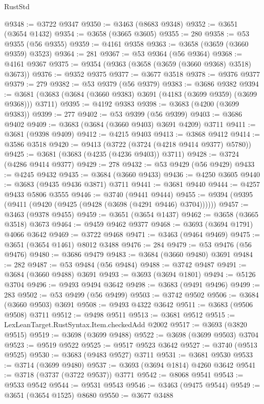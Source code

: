 \begin{lexlean}{RustStd}
\begin{coremodule}
@9348 := @3722 @9347
@9350 := @3463 (@8683 @9348)
@9352 := @3651 (@3654 @1432)
@9354 := @3658 (@3665 @3605)
@9355 := 280
@9358 := @53 @9355 (@56 @9355)
@9359 := @4161 @9358
@9363 := @3658 (@3659 (@3660 @9359) @3523)
@9364 := 281
@9367 := @53 @9364 (@56 @9364)
@9368 := @4161 @9367
@9375 := @9354 (@9363 (@3658 (@3659 (@3660 @9368) @3518) @3673))
@9376 := @9352 @9375
@9377 := @3677 @3518
@9378 := @9376 @9377
@9379 := 279
@9382 := @53 @9379 (@56 @9379)
@9383 := @3686 @9382
@9394 := @3681 (@3683 (@3684 (@3660 @9383) @3691 (@4183 (@3699 @9359) (@3699 @9368))) @3711)
@9395 := @4192 @9383
@9398 := @3683 (@4200 (@3699 @9383))
@9399 := 277
@9402 := @53 @9399 (@56 @9399)
@9403 := @3686 @9402
@9409 := @3683 (@3684 (@3660 @9403) @3691 @4209) @3711
@9411 := @3681 (@9398 @9409)
@9412 := @4215 @9403
@9413 := @3868 @9412
@9414 := @3586 @3518
@9420 := @9413 (@3722 (@3724 (@4218 @9414 @9377) @5780))
@9425 := @3681 (@3683 (@4235 (@4236 @9403)) @3711)
@9428 := @3724 (@4286 @9414 @9377)
@9429 := 278
@9432 := @53 @9429 (@56 @9429)
@9433 := @4245 @9432
@9435 := @3684 (@3660 @9433)
@9436 := @4250 @3605
@9440 := @3683 (@9435 @9436 @3871) @3711
@9441 := @3681 @9440
@9444 := @4257 @9433 @5806 @3555
@9446 := @3740 (@9441 @9444)
@9455 := @9394 (@9395 (@9411 (@9420 (@9425 (@9428 (@3698 (@4291 @9446) @3704))))))
@9457 := @3463 (@9378 @9455)
@9459 := @3651 (@3654 @1437)
@9462 := @3658 (@3665 @3518) @3673
@9464 := @9459 @9462 @9377
@9468 := @3693 (@3694 @1791) @4066 @3642
@9469 := @3722 @9468
@9471 := @3463 (@9464 @9469)
@9475 := @3651 (@3654 @1461) @8012 @3488
@9476 := 284
@9479 := @53 @9476 (@56 @9476)
@9480 := @3686 @9479
@9483 := @3684 (@3660 @9480) @3691
@9484 := 282
@9487 := @53 @9484 (@56 @9484)
@9488 := @3742 @9487
@9491 := @3684 (@3660 @9488) @3691
@9493 := @3693 (@3694 @1801)
@9494 := @5126 @3704
@9496 := @9493 @9494 @3642
@9498 := @3683 (@9491 @9496)
@9499 := 283
@9502 := @53 @9499 (@56 @9499)
@9503 := @3742 @9502
@9506 := @3684 (@3660 @9503) @3691
@9508 := @9493 @4322 @3642
@9511 := @3683 (@9506 @9508) @3711
@9512 := @9498 @9511
@9513 := @3681 @9512
@9515 := LexLeanTarget.RustSyntax.Item.checkedAdd @2002
@9517 := @3693 (@3820 @9515)
@9519 := @3698 (@3699 @9488)
@9522 := @3698 (@3699 @9503) @3704
@9523 := @9519 @9522
@9525 := @9517 @9523 @3642
@9527 := @3740 (@9513 @9525)
@9530 := @3683 (@9483 @9527) @3711
@9531 := @3681 @9530
@9533 := @3714 (@3699 @9480)
@9537 := @3693 (@3694 @1814) @4260 @3642
@9541 := @3718 (@3737 (@3722 @9537)) @3771
@9542 := @8068 @9541
@9543 := @9533 @9542
@9544 := @9531 @9543
@9546 := @3463 (@9475 @9544)
@9549 := @3651 (@3654 @1525) @8680
@9550 := @3677 @3488

\end{coremodule}
\end{lexlean}
